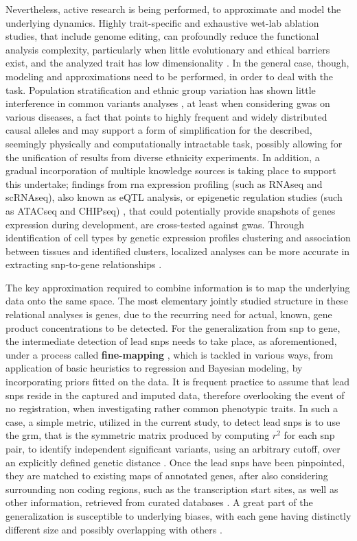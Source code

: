 Nevertheless, active research is being performed, to approximate and model the underlying dynamics. Highly trait-specific and exhaustive wet-lab ablation studies, that include genome editing, can profoundly reduce the functional analysis complexity, particularly when little evolutionary and ethical barriers exist, and the analyzed trait has low dimensionality \cite{Rao2021}. In the general case, though, modeling and approximations need to be performed, in order to deal with the task. Population stratification and ethnic group variation has shown little interference in common variants analyses \cite{Visscher2012}, at least when considering \ac{gwas} on various diseases, a fact that points to highly frequent and widely distributed causal alleles and may support a form of simplification for the described, seemingly physically and computationally intractable task, possibly allowing for the unification of results from diverse ethnicity experiments. In addition, a gradual incorporation of multiple knowledge sources is taking place to support this undertake; findings from \ac{rna} expression profiling (such as RNAseq and scRNAseq), also known as eQTL analysis, \cite{Yan2020,Zhou2022} or epigenetic regulation studies (such as ATACseq and CHIPseq) \cite{Corces2020,Huo2019}, that could potentially provide snapshots of genes expression during development, are cross-tested against \ac{gwas}. Through identification of cell types by genetic expression profiles clustering and association between tissues and identified clusters, localized analyses can be more accurate in extracting \ac{snp}-to-gene relationships \cite{Cano-Gamez2020}.

The key approximation required to combine information is to map the underlying data onto the same space. The most elementary jointly studied structure in these relational analyses is genes, due to the recurring need for actual, known, gene product concentrations to be detected. For the generalization from \ac{snp} to gene, the intermediate detection of lead \acp{snp} needs to take place, as aforementioned, under a process called \textbf{fine-mapping} \cite{Schaid2018}, which is tackled in various ways, from application of basic heuristics to regression and Bayesian modeling, by incorporating priors fitted on the data. It is frequent practice to assume that lead \acp{snp} reside in the captured and imputed data, therefore overlooking the event of no registration, when investigating rather common phenotypic traits. In such a case, a simple metric, utilized in the current study, to detect lead \acp{snp} is to use the \ac{grm}, that is the symmetric matrix produced by computing $r^2$ for each \ac{snp} pair, to identify independent significant variants, using an arbitrary cutoff, over an explicitly defined genetic distance \cite{Watanabe2017}. Once the lead \acp{snp} have been pinpointed, they are matched to existing maps of annotated genes, after also considering surrounding non coding regions, such as the transcription start sites, as well as other information, retrieved from curated databases \cite{Wang2010,McLean2010}. A great part of the generalization is susceptible to underlying biases, with each gene having distinctly different size and possibly overlapping with others \cite{Wang2011}.

